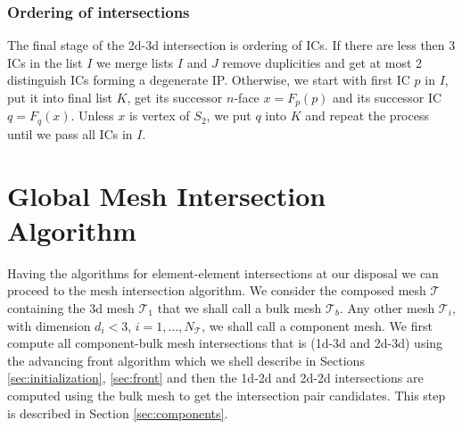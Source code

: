 \documentclass{elsarticle}
\newcommand{\notePE}[1]{{\color{Orange} \textbf{PE: } \textit{#1}}}
\newcommand{\nface}{$n$-face }
\begin{document}
% 
% 
\subsubsection{Ordering of intersections}
\label{sec:ordering}
The final stage of the 2d-3d intersection is ordering of ICs. If there are less then 3 ICs in the list $I$ we merge lists $I$ and $J$ remove duplicities
and get at most 2 distinguish ICs forming a degenerate IP. Otherwise, we start with first IC $p$ in $I$, put it into final list $K$, 
get its successor \nface $x = F_p(p)$ and its successor IC $q=F_q(x)$. Unless $x$ is vertex of $S_2$, we put $q$ into $K$ and repeat the process until 
we pass all ICs in $I$.

  

\section{Global Mesh Intersection Algorithm}
\label{sec:front_advancing}
Having the algorithms for element-element intersections at our disposal we can proceed to the mesh intersection algorithm. 
We consider the composed mesh $\mathcal T$ containing the 3d mesh $\mathcal T_1$ that we shall call a bulk mesh $\mathcal T_b$. Any other 
mesh $\mathcal T_i$, with dimension $d_i < 3$, $i=1,\dots, N_{\mathcal T}$, we shall call a component mesh. 
We first compute all component-bulk mesh intersections that is (1d-3d and 2d-3d) using the advancing front algorithm which we shell describe in Sections 
\ref{sec:initialization}, \ref{sec:front} and then the 1d-2d and 2d-2d 
intersections are computed using the bulk mesh to get the intersection pair candidates. This step is described in Section \ref{sec:components}.
\end{document}
